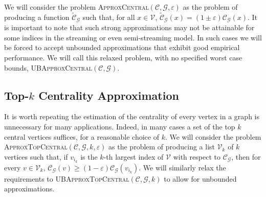 \documentclass{report}
\newcommand{\algoname}[1]{\textnormal{\textsc{#1}}}
\begin{document}
We will consider the problem \algoname{ApproxCentral}$(\mathcal{C}, \mathcal{G}, \varepsilon)$ as the problem of producing a function $\widetilde{\mathcal{C}}_\mathcal{G}$ such that, for all $x \in \mathcal{V}$, $\widetilde{\mathcal{C}}_\mathcal{G}(x) = (1 \pm \varepsilon)\mathcal{C}_\mathcal{G}(x)$. 
It is important to note that such strong approximations may not be attainable for some indices in the streaming or even semi-streaming model. 
In such cases we will be forced to accept unbounded approximations that exhibit good empirical performance. 
We will call this relaxed problem, with no specified worst case bounds, \algoname{UBApproxCentral}$(\mathcal{C}, \mathcal{G})$. 


\subsection{Top-$k$ Centrality Approximation} \label{sec:approx:topk}

It is worth repeating the estimation of the centrality of every vertex in a graph is unnecessary for many applications.
Indeed, in many cases a set of the top $k$ central vertices suffices, for a reasonable choice of $k$. 
We will consider the problem \algoname{ApproxTopCentral}$(\mathcal{C}, \mathcal{G}, k, \varepsilon)$ as the problem of producing a list $\mathcal{V}_k$ of $k$ vertices such that, if $v_{i_k}$ is the $k$-th largest index of $\mathcal{V}$ with respect to $\mathcal{C}_\mathcal{G}$, then for every $v \in \mathcal{V}_k$, $\mathcal{C}_\mathcal{G}(v) \geq (1-\varepsilon)\mathcal{C}_\mathcal{G}(v_{i_k})$. 
We will similarly relax the requirements to \algoname{UBApproxTopCentral}$(\mathcal{C}, \mathcal{G}, k)$ to allow for unbounded approximations. 
\end{document}
